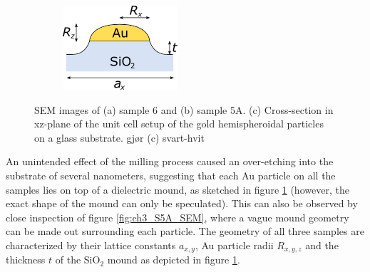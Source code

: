 \begin{figure}[htb]
\begin{subfigure}{0.3\textwidth}
        \includegraphics[width=\linewidth]{figures/Ch3/goldhemispheroids_sketch.png}
        \caption{}
        \label{fig:ch3_AuSiO2_sketch}
    \end{subfigure}
    \caption{SEM images of (a) sample 6 and (b) sample 5A. (c) Cross-section in xz-plane of the unit cell setup of the gold hemispheroidal particles on a glass substrate. \color{red}gjør (c) svart-hvit}
    \label{fig:ch3_AuSiO2_sketch+SEM}
\end{figure}

An unintended effect of the milling process caused an over-etching into the substrate of several nanometers, suggesting that each Au particle on all the samples lies on top of a dielectric mound, as sketched in figure \ref{fig:ch3_AuSiO2_sketch} (however, the exact shape of the mound can only be speculated). This can also be observed by close inspection of figure \ref{fig:ch3_S5A_SEM}, where a vague mound geometry can be made out surrounding each particle. The geometry of all three samples are characterized by their lattice constants $a_{x,y}$, Au particle radii $R_{x,y,z}$ and the thickness $t$ of the SiO$_2$ mound as depicted in figure \ref{fig:ch3_AuSiO2_sketch}.

